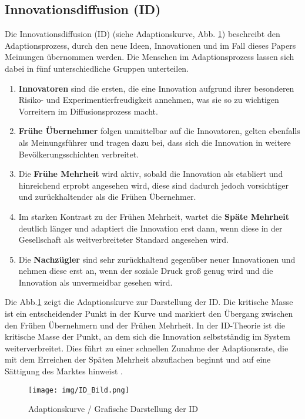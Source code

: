 \documentclass[runningheads]{llncs}
\begin{document}
\subsection{Innovationsdiffusion (ID)}\label{Innovationsdiffusion}
Die Innovationsdiffusion (ID) (siehe Adaptionskurve, Abb. \ref{fig:id}) beschreibt den Adaptionsprozess, durch den neue Ideen, Innovationen und im Fall dieses Papers Meinungen übernommen werden. Die Menschen im Adaptionsprozess lassen sich dabei in fünf unterschiedliche Gruppen unterteilen. 

\begin{enumerate}
  \item \textbf{Innovatoren} sind die ersten, die eine Innovation aufgrund ihrer besonderen Risiko- und Experimentierfreudigkeit annehmen, was sie so zu wichtigen Vorreitern im Diffusionsprozess macht.
  \item \textbf{Frühe Übernehmer} folgen unmittelbar auf die Innovatoren, gelten ebenfalls als Meinungsführer und tragen dazu bei, dass sich die Innovation in weitere Bevölkerungsschichten verbreitet. 
  \item Die \textbf{Frühe Mehrheit} wird aktiv, sobald die Innovation als etabliert und hinreichend erprobt angesehen wird, diese sind dadurch jedoch vorsichtiger und zurückhaltender als die Frühen Übernehmer.
  \item Im starken Kontrast zu der Frühen Mehrheit, wartet die \textbf{Späte Mehrheit} deutlich länger und adaptiert die Innovation erst dann, wenn diese in der Gesellschaft als weitverbreiteter Standard angesehen wird. 
  \item Die \textbf{Nachzügler} sind sehr zurückhaltend gegenüber neuer Innovationen und nehmen diese erst an, wenn der soziale Druck groß genug wird und die Innovation als unvermeidbar gesehen wird. 
\end{enumerate}

Die Abb.\ref{fig:id} zeigt die Adaptionskurve zur Darstellung der ID. Die kritische Masse ist ein entscheidender Punkt in der Kurve und markiert den Übergang zwischen den Frühen Übernehmern und der Frühen Mehrheit. 
In der ID-Theorie ist die kritische Masse der Punkt, an dem sich die Innovation selbstständig im System weiterverbreitet.
Dies führt zu einer schnellen Zunahme der Adaptionsrate, die mit dem Erreichen der Späten Mehrheit abzuflachen beginnt und auf eine Sättigung des Marktes hinweist  \cite{potthoff_diffusion_2016}. 
\begin{figure}
  \centering
  \texttt{[image: img/ID\_Bild.png]}
  \caption{Adaptionskurve / Grafische Darstellung der ID \cite{potthoff_diffusion_2016}}
  \label{fig:id}
\end{figure}
\end{document}
